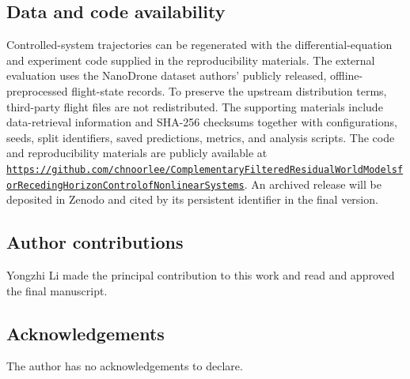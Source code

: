 \documentclass[pdflatex,sn-basic]{sn-jnl}
\begin{document}
\subsection*{Data and code availability}
{\sloppy Controlled-system trajectories can be regenerated with the
differential-equation and experiment code supplied in the reproducibility
materials. The external evaluation uses the NanoDrone dataset authors'
publicly released, offline-preprocessed flight-state records. To preserve the
upstream distribution terms, third-party flight files are not redistributed.
The supporting materials include data-retrieval information and SHA-256
checksums together with configurations, seeds, split identifiers, saved
predictions, metrics, and analysis scripts. The code and reproducibility
materials are publicly available at
\href{https://github.com/chnoorlee/Complementary-Filtered-Residual-World-Models-for-Receding-Horizon-Control-of-Nonlinear-Systems}{\texttt{https://\allowbreak github.com/\allowbreak chnoorlee/\allowbreak Complementary\-Filtered\-Residual\-World\-Models\-for\-Receding\-Horizon\-Control\-of\-Nonlinear\-Systems}}.
An archived release will be deposited in Zenodo and cited by its persistent
identifier in the final version.\par}

\subsection*{Author contributions}
Yongzhi Li made the principal contribution to this work and read and approved
the final manuscript.

\subsection*{Acknowledgements}
The author has no acknowledgements to declare.
\end{document}

